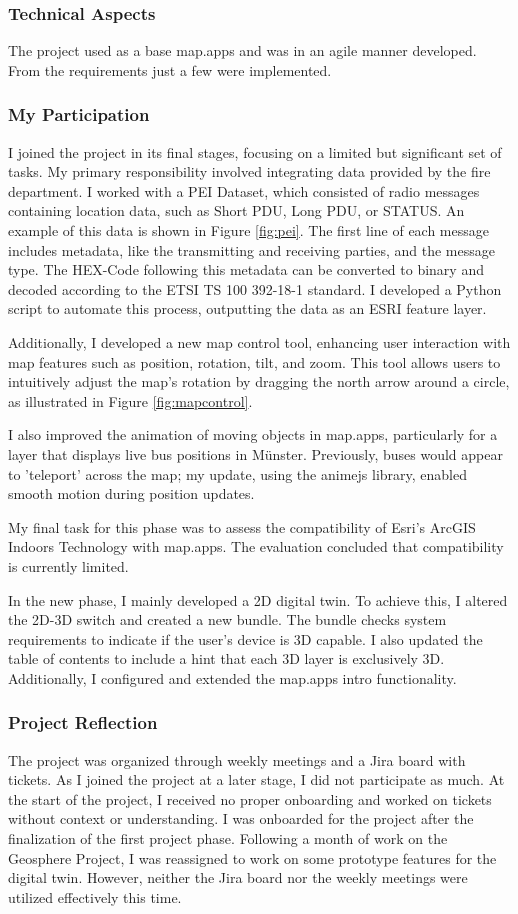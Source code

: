 \documentclass[11pt, titlepage, a4paper]{article}
\begin{document}
\subsubsection{Technical Aspects}
The project used as a base map.apps and was in an agile manner developed. From the requirements just a few were implemented.

\subsubsection{My Participation}
I joined the project in its final stages, focusing on a limited but significant set of tasks. My primary responsibility involved integrating data provided by the fire department. I worked with a PEI Dataset, which consisted of radio messages containing location data, such as Short PDU, Long PDU, or STATUS. An example of this data is shown in Figure \ref{fig:pei}. The first line of each message includes metadata, like the transmitting and receiving parties, and the message type. The HEX-Code following this metadata can be converted to binary and decoded according to the ETSI TS 100 392-18-1 standard. I developed a Python script to automate this process, outputting the data as an ESRI feature layer.

Additionally, I developed a new map control tool, enhancing user interaction with map features such as position, rotation, tilt, and zoom. This tool allows users to intuitively adjust the map's rotation by dragging the north arrow around a circle, as illustrated in Figure \ref{fig:mapcontrol}.


I also improved the animation of moving objects in map.apps, particularly for a layer that displays live bus positions in Münster. Previously, buses would appear to 'teleport' across the map; my update, using the animejs library, enabled smooth motion during position updates.

My final task for this phase was to assess the compatibility of Esri's ArcGIS Indoors Technology with map.apps. The evaluation concluded that compatibility is currently limited.

In the new phase, I mainly developed a 2D digital twin. To achieve this, I altered the 2D-3D switch and created a new bundle. The bundle checks system requirements to indicate if the user's device is 3D capable. I also updated the table of contents to include a hint that each 3D layer is exclusively 3D. 
Additionally, I configured and extended the map.apps intro functionality.
\subsubsection{Project Reflection}
The project was organized through weekly meetings and a Jira board with tickets. As I joined the project at a later stage, I did not participate as much. At the start of the project, I received no proper onboarding and worked on tickets without context or understanding. I was onboarded for the project after the finalization of the first project phase. Following a month of work on the Geosphere Project, I was reassigned to work on some prototype features for the digital twin. However, neither the Jira board nor the weekly meetings were utilized effectively this time.
\end{document}
